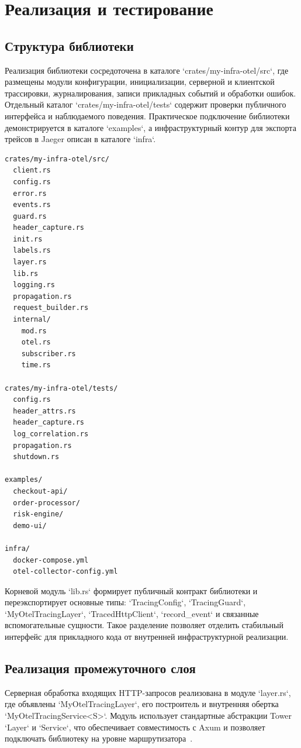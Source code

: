 \chapter{Реализация и тестирование}
\label{chap:implementation-and-testing}

\section{Структура библиотеки}

Реализация библиотеки сосредоточена в каталоге `crates/my-infra-otel/src`, где
размещены модули конфигурации, инициализации, серверной и клиентской
трассировки, журналирования, записи прикладных событий и обработки ошибок.
Отдельный каталог `crates/my-infra-otel/tests` содержит проверки публичного
интерфейса и наблюдаемого поведения. Практическое подключение библиотеки
демонстрируется в каталоге `examples`, а инфраструктурный контур для экспорта
трейсов в Jaeger описан в каталоге `infra`.

\begin{verbatim}
crates/my-infra-otel/src/
  client.rs
  config.rs
  error.rs
  events.rs
  guard.rs
  header_capture.rs
  init.rs
  labels.rs
  layer.rs
  lib.rs
  logging.rs
  propagation.rs
  request_builder.rs
  internal/
    mod.rs
    otel.rs
    subscriber.rs
    time.rs

crates/my-infra-otel/tests/
  config.rs
  header_attrs.rs
  header_capture.rs
  log_correlation.rs
  propagation.rs
  shutdown.rs

examples/
  checkout-api/
  order-processor/
  risk-engine/
  demo-ui/

infra/
  docker-compose.yml
  otel-collector-config.yml
\end{verbatim}

Корневой модуль `lib.rs` формирует публичный контракт библиотеки и переэкспортирует
основные типы: `TracingConfig`, `TracingGuard`, `MyOtelTracingLayer`,
`TracedHttpClient`, `record_event` и связанные вспомогательные сущности. Такое
разделение позволяет отделить стабильный интерфейс для прикладного кода от
внутренней инфраструктурной реализации.

\section{Реализация промежуточного слоя}

Серверная обработка входящих HTTP-запросов реализована в модуле `layer.rs`, где
объявлены `MyOtelTracingLayer`, его построитель и внутренняя обертка
`MyOtelTracingService<S>`. Модуль использует стандартные абстракции Tower
`Layer` и `Service`, что обеспечивает совместимость с Axum и позволяет
подключать библиотеку на уровне маршрутизатора~\cite{towerDocs,towerServiceDocs,towerLayerDocs,axumDocs}.

